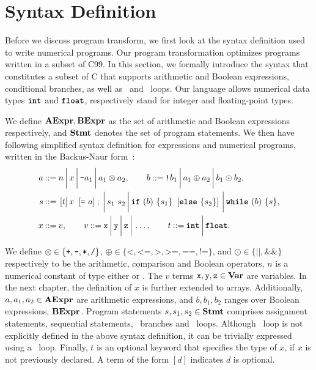 \section{Syntax Definition}
\label{po:sec:syntax_definition}

Before we discuss program transform, we first look at the syntax definition
used to write numerical programs.  Our program transformation optimizes
programs written in a subset of C99.  In this section, we formally introduce
the syntax that constitutes a subset of C that supports arithmetic and Boolean
expressions, conditional branches, as well as \whilelit~and \forlit~loops.  Our
language allows numerical data types $\texttt{\textbf{int}}$ and $\texttt{\textbf{float}}$, respectively
stand for integer and floating-point types.

We define $\mathbf{AExpr}, \mathbf{BExpr}$ as the set of arithmetic and Boolean
expressions respectively, and $\mathbf{Stmt}$ denotes the set of program statements.
We then have following simplified syntax definition for expressions and
numerical programs, written in the Backus-Naur form~\cite{knuth64}:
\begin{equation}
    \begin{aligned}
        a \mathbin{::=} {} &
            n \,\bigg|\,
            x \,\bigg|\,
            \texttt{-}a_1 \,\bigg|\,
            a_1 \otimes a_2, \qquad
        b \mathbin{::=}
            \texttt{!}b_1 \,\bigg|\,
            a_1 \oplus a_2 \,\bigg|\,
            b_1 \odot b_2, \\
        s \mathbin{::=} {} &
            \left[ t \right] x~\left[ \texttt{=}~a \right] \mathbin{;} \,\bigg|\,
            s_1~s_2 \,\bigg|\,
            \texttt{\textbf{if}}~(b)~\{ s_1 \}~\left[\texttt{\textbf{else}}~\{ s_2 \}\right] \,\bigg|\,
            \texttt{\textbf{while}}~(b)~\{s\}, \\
        x \mathbin{::=} {} & v, \qquad
        v \mathbin{::=} \texttt{x} \,\bigg|\, \texttt{y} \,\bigg|\, \texttt{z} \,\bigg|\, \mathellipsis, \qquad
        t \mathbin{::=} \texttt{\textbf{int}} \,\bigg|\, \texttt{\textbf{float}}.
    \end{aligned}
    \label{po:eq:program_syntax}
\end{equation}

We define $\otimes \in \left\{ \texttt{+}, \texttt{-}, \texttt{*}, \texttt{/}
\right\}$, $\oplus \in \{ \texttt{<}, \texttt{<=}, \texttt{>}, \texttt{>=},
\texttt{==}, \texttt{!=} \}$, and $\odot \in \{ \texttt{||}, \texttt{\&\&}
\}$ respectively to be the arithmetic, comparison and Boolean operators,
$n$ is a numerical constant of type either \inttype{} or \floattype.  The
$v$ terms $\texttt{x}, \texttt{y}, \texttt{z} \in \mathbf{Var}$ are variables.  In the next
chapter, the definition of $x$ is further extended to arrays.  Additionally,
$a, a_1, a_2 \in \mathbf{AExpr}$ are arithmetic expressions, and $b, b_1, b_2$
ranges over Boolean expressions, $\mathbf{BExpr}$.  Program statements $s, s_1,
s_2 \in \mathbf{Stmt}$ comprises assignment statements, sequential statements,
\iflit~branches and \whilelit~loops.  Although \forlit~loop is not explicitly
defined in the above syntax definition, it can be trivially expressed using a
\whilelit~loop.  Finally, $t$ is an optional keyword that specifies the type of
$x$, if $x$ is not previously declared.  A term of the form $[d]$ indicates $d$
is optional.

